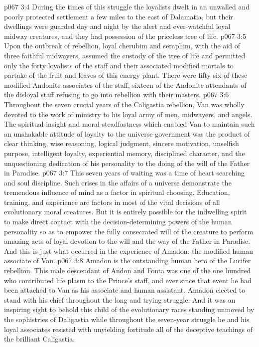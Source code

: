 \vs p067 3:4 During the times of this struggle the loyalists dwelt in an unwalled and poorly protected settlement a few miles to the east of Dalamatia, but their dwellings were guarded day and night by the alert and ever\hyp{}watchful loyal midway creatures, and they had possession of the priceless tree of life.
\vs p067 3:5 Upon the outbreak of rebellion, loyal cherubim and seraphim, with the aid of three faithful midwayers, assumed the custody of the tree of life and permitted only the forty loyalists of the staff and their associated modified mortals to partake of the fruit and leaves of this energy plant. There were fifty\hyp{}six of these modified Andonite associates of the staff, sixteen of the Andonite attendants of the disloyal staff refusing to go into rebellion with their masters.
\vs p067 3:6 \pc Throughout the seven crucial years of the Caligastia rebellion, Van was wholly devoted to the work of ministry to his loyal army of men, midwayers, and angels. The spiritual insight and moral steadfastness which enabled Van to maintain such an unshakable attitude of loyalty to the universe government was the product of clear thinking, wise reasoning, logical judgment, sincere motivation, unselfish purpose, intelligent loyalty, experiential memory, disciplined character, and the unquestioning dedication of his personality to the doing of the will of the Father in Paradise.
\vs p067 3:7 This seven years of waiting was a time of heart searching and soul discipline. Such crises in the affairs of a universe demonstrate the tremendous influence of mind as a factor in spiritual choosing. Education, training, and experience are factors in most of the vital decisions of all evolutionary moral creatures. But it is entirely possible for the indwelling spirit to make direct contact with the decision\hyp{}determining powers of the human personality so as to empower the fully consecrated will of the creature to perform amazing acts of loyal devotion to the will and the way of the Father in Paradise. And this is just what occurred in the experience of Amadon, the modified human associate of Van.
\vs p067 3:8 Amadon is the outstanding human hero of the Lucifer rebellion. This male descendant of Andon and Fonta was one of the one hundred who contributed life plasm to the Prince’s staff, and ever since that event he had been attached to Van as his associate and human assistant. Amadon elected to stand with his chief throughout the long and trying struggle. And it was an inspiring sight to behold this child of the evolutionary races standing unmoved by the sophistries of Daligastia while throughout the seven\hyp{}year struggle he and his loyal associates resisted with unyielding fortitude all of the deceptive teachings of the brilliant Caligastia.
